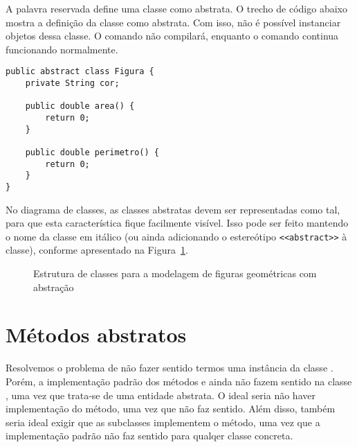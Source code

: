 A palavra reservada  define uma classe como abstrata. O trecho de código abaixo mostra a definição da classe  como abstrata. Com isso, não é possível instanciar objetos dessa classe. O comando  não compilará, enquanto o comando  continua funcionando normalmente.

\begin{verbatim}
public abstract class Figura {
	private String cor;

	public double area() {
		return 0;
	}
	
	public double perimetro() {
		return 0;
	}
}
\end{verbatim}

No diagrama de classes, as classes abstratas devem ser representadas como tal, para que esta característica fique facilmente visível. Isso pode ser feito mantendo o nome da classe em itálico (ou ainda adicionando o estereótipo \texttt{<<abstract>>} à classe), conforme apresentado na Figura~\ref{fig:abstratas-figuras-abstract}.

\begin{figure}[h]
	\centering
	
	
	\caption{Estrutura de classes para a modelagem de figuras geométricas com abstração}
	\label{fig:abstratas-figuras-abstract}
\end{figure}

\section{Métodos abstratos}

Resolvemos o problema de não fazer sentido termos uma instância da classe . Porém, a implementação padrão dos métodos  e  ainda não fazem sentido na classe , uma vez que trata-se de uma entidade abstrata. O ideal seria não haver implementação do método, uma vez que não faz sentido. Além disso, também seria ideal exigir que as subclasses implementem o método, uma vez que a implementação padrão não faz sentido para qualqer classe concreta.

